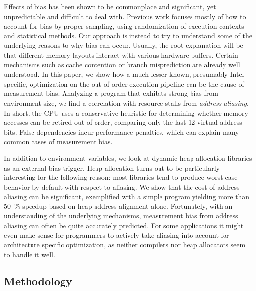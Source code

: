 \documentclass[a4paper,10pt,twocolumn,twoside]{article}
\begin{document}
Effects of bias has been shown to be commonplace and significant, yet unpredictable and difficult to deal with.
Previous work focuses mostly of how to account for bias by proper sampling, using randomization of execution contexts and statistical methods.
Our approach is instead to try to understand some of the underlying reasons to why bias can occur.
Usually, the root explanation will be that different memory layouts interact with various hardware buffers.
Certain mechanisms such as cache contention or branch misprediction are already well understood.
In this paper, we show how a much lesser known, presumably Intel specific, optimization on the out-of-order execution pipeline can be the cause of measurement bias.
Analyzing a program that exhibits strong bias from environment size, we find a correlation with resource stalls from \emph{address aliasing}.
In short, the CPU uses a conservative heuristic for determining whether memory accesses can be retired out of order, comparing only the last 12 virtual address bits.
False dependencies incur performance penalties, which can explain many common cases of measurement bias.

In addition to environment variables, we look at dynamic heap allocation libraries as an external bias trigger.
Heap allocation turns out to be particularly interesting for the following reason: most libraries tend to produce worst case behavior by default with respect to aliasing.
We show that the cost of address aliasing can be significant, exemplified with a simple program yielding more than 50~\% speedup based on heap address alignment alone.
Fortunately, with an understanding of the underlying mechanisms, measurement bias from address aliasing can often be quite accurately predicted.
For some applications it might even make sense for programmers to actively take aliasing into account for architecture specific optimization, as neither compilers nor heap allocators seem to handle it well.





\subsection{Methodology}
\end{document}
